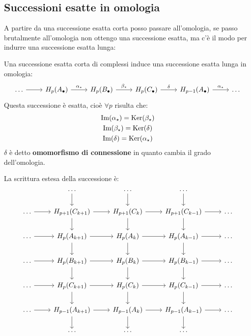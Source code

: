 \subsection{Successioni esatte in omologia}
A partire da una successione esatta corta posso passare all'omologia, se passo
brutalmente all'omologia non ottengo una successione esatta, ma c'è il modo per
indurre una successione esatta lunga:
\begin{theorem}
  Una successione esatta corta di complessi induce una successione
  esatta lunga in omologia:
  \[
    \begin{tikzcd}
      \dots \arrow{r}{} & H_p(A_\bullet) \arrow{r}{\alpha_\star} & H_p(B_\bullet) \arrow{r}{\beta_\star} & H_p(C_\bullet) \arrow{r}{\delta}
      & H_{p-1}(A_\bullet) \arrow{r}{\alpha_\star} & \dots
    \end{tikzcd}
  \]
  Questa successione è esatta, cioè $ \forall p $ risulta che:
  \begin{gather*}
    \mathrm{Im}( \alpha_\star ) = \mathrm{Ker}( \beta_\star) \\
    \mathrm{Im}( \beta_\star ) = \mathrm{Ker}( \delta) \\
    \mathrm{Im}( \delta ) = \mathrm{Ker}( \alpha_\star)
  \end{gather*}
  $ \delta $ è detto \textbf{omomorfismo di connessione}
  in quanto cambia il grado dell'omologia.

  La scrittura estesa della successione è:
  \[
    \begin{tikzcd}
      {} & \dots  \arrow{d}{} &  \dots  \arrow{d}{}  &  \dots  \arrow{d}{}  & {} \\
      \dots \arrow{r}{} & H_{p+1}(C_{k+1}) \arrow{r}{} \arrow{d}{} &  H_{p+1}(C_{k}) \arrow{r}{} \arrow{d}{} &  H_{p+1}(C_{k-1}) \arrow{r}{} \arrow{d}{} & \dots \\
      \dots \arrow{r}{} & H_p(A_{k+1}) \arrow{r}{} \arrow{d}{} & H_p(A_{k})  \arrow{r}{} \arrow{d}{} & H_p(A_{k-1})  \arrow{r}{} \arrow{d}{} & \dots \\
      \dots \arrow{r}{} & H_p(B_{k+1}) \arrow{r}{} \arrow{d}{} & H_p(B_{k})  \arrow{r}{} \arrow{d}{} & H_p(B_{k-1})  \arrow{r}{} \arrow{d}{} & \dots \\
      \dots \arrow{r}{} & H_p(C_{k+1}) \arrow{r}{} \arrow{d}{} & H_p(C_{k})  \arrow{r}{} \arrow{d}{} & H_p(C_{k-1})  \arrow{r}{} \arrow{d}{} & \dots \\
      \dots \arrow{r}{} & H_{p-1}(A_{k+1}) \arrow{r}{} \arrow{d}{}  &  H_{p-1}(A_{k}) \arrow{r}{} \arrow{d}{} &  H_{p-1}(A_{k-1}) \arrow{r}{} \arrow{d}{} & \dots \\
      {} & \dots &  \dots &  \dots & {}
    \end{tikzcd}
  \]
\end{theorem}
